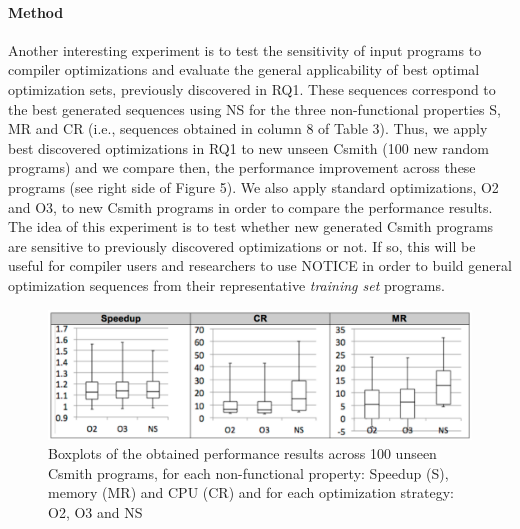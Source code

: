\paragraph{Method}
Another interesting experiment is to test the sensitivity of input programs to compiler optimizations and evaluate the general applicability of best optimal optimization sets, previously discovered in RQ1. These sequences correspond to the best generated sequences using NS for the three non-functional properties S, MR and CR (i.e., sequences obtained in column 8 of Table 3). 
Thus, we apply best discovered optimizations in RQ1 to new unseen Csmith (100 new random programs) and we compare then, the performance improvement across these programs (see right side of Figure 5). We also apply standard optimizations, O2 and O3, to new Csmith programs in order to compare the performance results.
The idea of this experiment is to test whether new generated Csmith programs are sensitive to previously discovered optimizations or not. 
If so, this will be useful for compiler users and researchers to use NOTICE in order to build general optimization sequences from their representative \textit{training set} programs.
\vspace{-1.2em}
\begin{figure}[h]
	\centering
	\includegraphics[width=1.\linewidth]{chapitre3/fig/box.pdf}
	\caption{Boxplots of the obtained performance results across 100 unseen Csmith programs, for each non-functional property: Speedup (S), memory (MR) and CPU (CR) and for each optimization strategy: O2, O3 and NS}
\end{figure}
